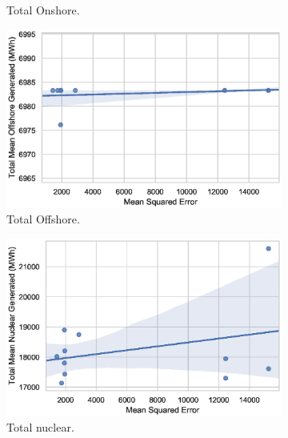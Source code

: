 \documentclass[final,3p,times,twocolumn,numbers]{elsarticle}
\begin{document}
\begin{figure}[h!]
\begin{subfigure}[b]{0.3\textwidth}
\caption{Total Onshore.}
\label{fig:total_Onshore_mean_output}
\end{subfigure}
\medskip
\begin{subfigure}[b]{0.3\textwidth}   
\includegraphics[width=\columnwidth]{figures/results/elecsim_results/results_2/total_Offshore_mean_output.eps}
\caption{Total Offshore.}
\label{fig:total_Offshore_mean_output}
\end{subfigure}
\hfil
\begin{subfigure}[b]{0.3\textwidth}
\includegraphics[width=\columnwidth]{figures/results/elecsim_results/results_2/total_Nuclear_mean_output.eps}
\caption{Total nuclear.}
\label{fig:total_nuclear_mean_output}
\end{subfigure}
\hfil
\begin{subfigure}[b]{0.3\textwidth}  

\end{subfigure}
\end{figure}
\end{document}
